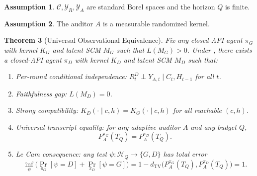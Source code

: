 \documentclass{article}
\theoremstyle{plain}
\newtheorem{theorem}{Theorem}
\theoremstyle{definition}
\newtheorem{assumption}[theorem]{Assumption}
\theoremstyle{remark}
\newcommand{\TV}{\mathrm{TV}}
\newcommand{\dtv}{d_{\TV}}
\newcommand{\C}{\mathcal{C}}
\newcommand{\YR}{\mathcal{Y}_R}
\newcommand{\YA}{\mathcal{Y}_A}
\newcommand{\Hist}{\mathcal{H}}
\newcommand{\PpiA}[1]{P_A^{\pi_{#1}}}
\begin{document}
\begin{assumption}\label{ass:standard-borel}
$\C, \YR, \YA$ are standard Borel spaces and the horizon $Q$ is finite.
\end{assumption}

\begin{assumption}\label{ass:auditor}
The auditor $A$ is a measurable randomized kernel.
\end{assumption}

\begin{theorem}[Universal Observational Equivalence]\label{thm:transcript-indist}
Fix any closed-API agent $\pi_G$ with kernel $K_G$ and latent SCM $M_G$ such
that $L(M_G) > 0$. Under , there exists
a closed-API agent $\pi_D$ with kernel $K_D$ and latent SCM $M_D$ such that:
\begin{enumerate}
  \item[(i)] \emph{Per-round conditional independence:}
    $R_t^D \perp Y_{A,t} \mid C_t, H_{t-1}$ for all $t$.
  \item[(ii)] \emph{Faithfulness gap:} $L(M_D) = 0$.
  \item[(iii)] \emph{Strong compatibility:}
    $K_D(\cdot \mid c, h) = K_G(\cdot \mid c, h)$ for all reachable $(c, h)$.
  \item[(iv)] \emph{Universal transcript equality:} for any adaptive auditor
    $A$ and any budget $Q$,
    \[
    \PpiA{G}(T_Q) = \PpiA{D}(T_Q).
    \]
  \item[(v)] \emph{Le Cam consequence:} any test
    $\psi : \Hist_Q \to \{G, D\}$ has total error
    \[
    \inf_\psi \big( \Pr_{\pi_G}[\psi = D] + \Pr_{\pi_D}[\psi = G] \big)
    = 1 - \dtv\big(\PpiA{G}(T_Q), \PpiA{D}(T_Q)\big) = 1.
    \]
\end{enumerate}
\end{theorem}
\end{document}
